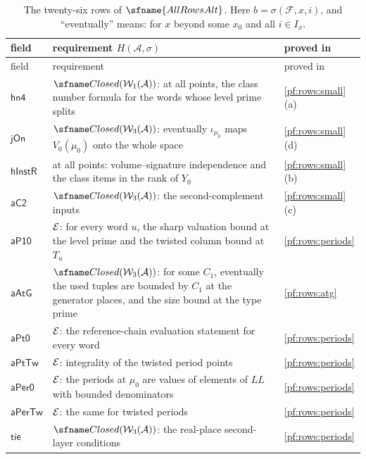 {\small
\begin{longtable}{>{\raggedright\arraybackslash}p{}>{\raggedright\arraybackslash}p{}>{\raggedright\arraybackslash}p{}}
\caption{The twenty-six rows of $\sfname{AllRowsAlt}$. Here $b=\sigma(\mathcal F,x,i)$, and ``eventually'' means: for
$x$ beyond some $x_0$ and all $i\in I_x$.}\label{tab:pf:rows:fields}\\
\toprule
field & requirement $H(\mathcal A,\sigma)$ & proved in\\
\midrule
\endfirsthead
\toprule
field & requirement & proved in\\
\midrule
\endhead
\bottomrule
\endfoot
$\mathsf{hn4}$ & $\rowsClosed(\rowsWi(\mathcal A))$: at all points, the class number formula for the words whose level prime
splits & \cref{pf:rows:small}(a)\\
$\mathsf{jOn}$ & $\rowsClosed(\rowsWiii(\mathcal A))$: eventually $\iota_{\mu_0}$ maps $V_0(\mu_0)$ onto the whole space & \cref{pf:rows:small}(d)\\
$\mathsf{hInstR}$ & at all points: volume--signature independence and the class items in the rank of $Y_0$
& \cref{pf:rows:small}(b)\\
$\mathsf{aC2}$ & $\rowsClosed(\rowsWiii(\mathcal A))$: the second-complement inputs & \cref{pf:rows:small}(c)\\
$\mathsf{aP10}$ & $\mathcal{E}$: for every word $u$, the sharp valuation bound at the level prime and the
twisted column bound at $T_u$ & \cref{pf:rows:periods}\\
$\mathsf{aAtG}$ & $\rowsClosed(\rowsWiii(\mathcal A))$: for some $C_1$, eventually the used tuples are bounded by $C_1$ at the
generator places, and the size bound at the type prime & \cref{pf:rows:atg}\\
$\mathsf{aPt0}$ & $\mathcal{E}$: the reference-chain evaluation statement for every word & \cref{pf:rows:periods}\\
$\mathsf{aPtTw}$ & $\mathcal{E}$: integrality of the twisted period points & \cref{pf:rows:periods}\\
$\mathsf{aPer0}$ & $\mathcal{E}$: the periods at $\mu_0$ are values of elements of $\mathit{LL}$ with bounded denominators
& \cref{pf:rows:periods}\\
$\mathsf{aPerTw}$ & $\mathcal{E}$: the same for twisted periods & \cref{pf:rows:periods}\\
$\mathsf{tie}$ & $\rowsClosed(\rowsWiii(\mathcal A))$: the real-place second-layer conditions & \cref{pf:rows:periods}\\

\end{longtable}}
